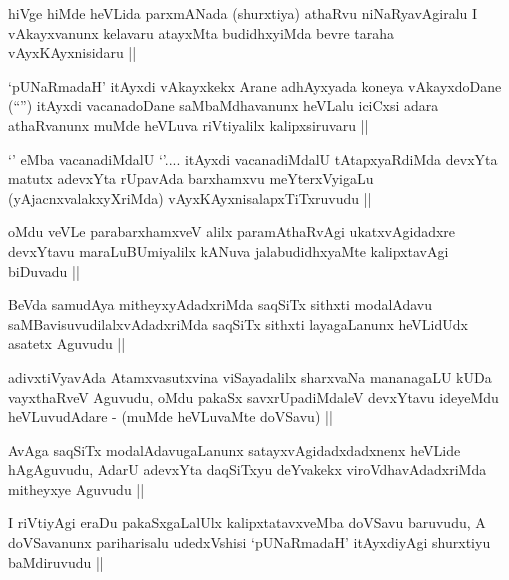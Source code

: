 \begin{artha}
hiVge hiMde heVLida parxmANada (shurxtiya) athaRvu niNaRyavAgiralu I vAkayxvanunx kelavaru atayxMta budidhxyiMda bevre taraha vAyxKAyxnisidaru ||
\end{artha}


\begin{artha}
`pUNaRmadaH' itAyxdi vAkayxkekx Arane adhAyxyada koneya vAkayxdoDane (``\stext'') itAyxdi vacanadoDane saMbaMdhavanunx heVLalu iciCxsi adara athaRvanunx muMde heVLuva riVtiyalilx kalipxsiruvaru ||
\end{artha}


\begin{artha}
`\stext' eMba vacanadiMdalU `\stext'.... itAyxdi vacanadiMdalU tAtapxyaRdiMda devxYta matutx adevxYta rUpavAda barxhamxvu meYterxVyigaLu (yAjacnxvalakxyXriMda) vAyxKAyxnisalapxTiTxruvudu ||
\end{artha}

\begin{artha}
oMdu veVLe parabarxhamxveV alilx paramAthaRvAgi ukatxvAgidadxre devxYtavu maraLuBUmiyalilx kANuva jalabudidhxyaMte kalipxtavAgi biDuvadu ||
\end{artha}


\begin{artha}
BeVda samudAya mitheyxyAdadxriMda saqSiTx sithxti modalAdavu saMBavisuvudilalxvAdadxriMda saqSiTx sithxti layagaLanunx heVLidUdx asatetx Aguvudu ||
\end{artha}

\begin{artha}
adivxtiVyavAda Atamxvasutxvina viSayadalilx sharxvaNa mananagaLU kUDa vayxthaRveV Aguvudu, oMdu pakaSx savxrUpadiMdaleV devxYtavu ideyeMdu heVLuvudAdare - (muMde heVLuvaMte doVSavu) ||
\end{artha}

\begin{artha}
AvAga saqSiTx modalAdavugaLanunx satayxvAgidadxdadxnenx heVLide hAgAguvudu, AdarU adevxYta daqSiTxyu deYvakekx viroVdhavAdadxriMda mitheyxye Aguvudu ||
\end{artha}

\begin{artha}
I riVtiyAgi eraDu pakaSxgaLalUlx kalipxtatavxveMba doVSavu baruvudu, A doVSavanunx pariharisalu udedxVshisi `pUNaRmadaH' itAyxdiyAgi shurxtiyu baMdiruvudu ||
\end{artha}

